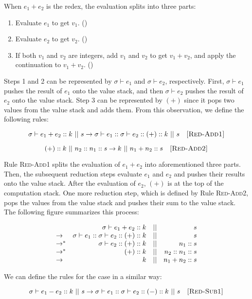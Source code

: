 When $e_1+e_2$ is the redex, the evaluation splits into three parts:
\begin{enumerate}
  \item Evaluate $e_1$ to get $v_1$. ()
  \item Evaluate $e_2$ to get $v_2$. ()
  \item If both $v_1$ and $v_2$ are integers, add $v_1$ and $v_2$ to get $v_1+v_2$,
    and apply the continuation to $v_1+v_2$. ()
\end{enumerate}
Steps 1 and 2 can be represented by $\sigma\vdash e_1$ and $\sigma\vdash e_2$,
respectively. First, $\sigma\vdash e_1$ pushes the result of $e_1$ onto the value
stack, and then $\sigma\vdash e_2$ pushes the result of $e_2$ onto the value
stack. Step 3 can be represented by $(+)$ since it pops two values from the
value stack and adds them.
From this observation, we define the following rules:

\[
  \sigma\vdash e_1+e_2::k\ ||\ s\rightarrow \sigma\vdash e_1::\sigma\vdash e_2::(+):: k\ ||\ s
  \quad\textsc{[Red-Add1]}
\]

\[
  \addk k\ ||\ \conss{n_2}\conss{n_1}s\rightarrow k\ ||\ \conss{n_1+n_2}s
  \quad\textsc{[Red-Add2]}
\]

Rule \textsc{Red-Add1} splits the evaluation of $e_1+e_2$ into aforementioned
three parts. Then, the subsequent reduction steps evaluate $e_1$ and $e_2$ and
pushes their results onto the value stack. After the evaluation of $e_2$, $(+)$
is at the top of the computation stack. One more reduction step, which is
defined by Rule \textsc{Red-Add2}, pops the values
from the value stack and pushes their sum to the value stack. The following
figure summarizes this process:

\[
\begin{array}{lrcr}
& \sigma\vdash e_1+e_2::k & || & s \\
\rightarrow & \sigma\vdash e_1::\sigma\vdash e_2::(+):: k & || & s \\
\rightarrow^\ast & \sigma\vdash e_2::(+):: k & || & n_1::s \\
\rightarrow^\ast & (+):: k & || & n_2::n_1::s \\
\rightarrow & k & || & n_1+n_2::s
\end{array}
\]

We can define the rules for the  case in a similar way:

\[
  \sigma\vdash e_1-e_2::k\ ||\ s\rightarrow \sigma\vdash e_1::\sigma\vdash e_2::(-):: k\ ||\ s
  \quad\textsc{[Red-Sub1]}
\]

